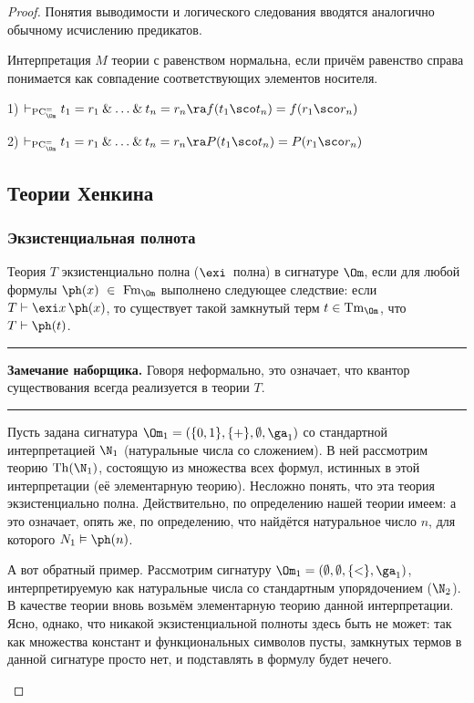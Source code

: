 \documentclass[a4paper,draft]{article}
\let\amper\&
\def\&{\mathbin{\amper}}
\def\exis#1{\exi#1\,}
\newcommand{\vv}{\vDash}
\newenvironment{nbb}{\par\vskip3pt\hrule\vskip3pt\textbf{\footnotesize Замечание наборщика.}\footnotesize }
{\vskip3pt\hrule\par\vskip3pt}
\DeclareMathOperator{\PC}{PC}
\DeclareMathOperator{\Fm}{Fm}
\DeclareMathOperator{\Tm}{Tm}
\DeclareMathOperator{\Th}{Th}
\begin{document}
\begin{proof}
Понятия выводимости и логического следования вводятся аналогично обычному исчислению предикатов.

\begin{df}
Интерпретация $M$ теории с равенством нормальна, если
\equ{M\vv a=b\Lra a=b,}
причём равенство справа понимается как совпадение соответствующих элементов носителя.
\end{df}

\begin{lemma}

1) $\vdash_{\PC_\Om^=}t_1=r_1\&\ldots\& t_n=r_n\ra f(t_1\sco t_n)=f(r_1\sco r_n)$

2) $\vdash_{\PC_\Om^=}t_1=r_1\&\ldots\& t_n=r_n\ra P(t_1\sco t_n)=P(r_1\sco r_n)$
\end{lemma}


\subsection{Теории Хенкина}

\subsubsection{Экзистенциальная полнота}

\begin{df}
Теория $T$ экзистенциально полна ($\exis$ полна) в сигнатуре $\Om$, если для любой
формулы $\ph(x)~\in~\Fm_{\Om}$ выполнено следующее следствие: если $T\vdash\exis x\ph(x)$, то
существует такой замкнутый терм $t\in\Tm_{\Om}$, что $T\vdash\ph(t)$.
\end{df}
\begin{nbb}
Говоря неформально, это означает, что квантор существования всегда реализуется в теории $T$.
\end{nbb}
\begin{ex}
Пусть задана сигнатура $\Om_1=(\{0,1\},\{+\},\emptyset,\ga_1)$ со стандартной интерпретацией $\N_1$ (натуральные числа со сложением).
В ней рассмотрим теорию $\Th(\N_1)$, состоящую из множества всех формул, истинных в этой интерпретации
(её элементарную теорию).
Несложно понять, что эта теория экзистенциально полна. Действительно, по определению нашей теории имеем:
\equ{\Th(\N_1)\vdash\exis x\ph(x)\Lra \N_1\vDash\exis x\ph(x),}
а это означает, опять же, по определению, что найдётся натуральное число $n$, для которого
$N_1\vDash\ph(n)$.
\end{ex}
\begin{ex}
А вот обратный пример. Рассмотрим сигнатуру $\Om_1=(\emptyset,\emptyset, \{<\},\ga_1)$, интерпретируемую как натуральные числа
со стандартным упорядочением ($\N_2$). В качестве теории вновь возьмём элементарную теорию данной интерпретации.
Ясно, однако, что никакой экзистенциальной полноты здесь быть не может: так как множества констант и функциональных символов пусты,
замкнутых термов в данной сигнатуре просто нет, и подставлять в формулу будет нечего.
\end{ex}

\end{proof}
\end{document}
